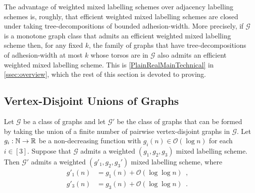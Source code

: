 \documentclass{patmorin}
\newcommand{\Oh}{\mathcal{O}}
\begin{document}
The advantage of weighted mixed labelling schemes over adjacency labelling schemes is, roughly, that efficient weighted mixed labelling schemes are closed under taking tree-decompositions of bounded adhesion-width. More precisely, if $\mathcal{G}$ is a monotone graph class that admits an efficient weighted mixed labelling scheme then, for any fixed $k$, the family of graphs that have tree-decompositions of adhesion-width at most $k$ whose torsos are in $\mathcal{G}$ also admits an efficient weighted mixed labelling scheme. This is \cref{PlainRealMainTechnical} in \cref{ssec:overview}, which the rest of this section is devoted to proving.

\subsection{Vertex-Disjoint Unions of Graphs}



\begin{lem}\label{disjoint_union_ii}
    Let $\mathcal{G}$ be a class of graphs and let $\mathcal{G}'$ be the class of graphs that can be formed by taking the union of a finite number of pairwise vertex-disjoint graphs in $\mathcal{G}$.
    Let $g_i:\mathbb{N}\to\mathbb{R}$ be a non-decreasing function  with $g_i(n)\in \Oh(\log n)$ for each $i\in[3]$.
    Suppose that $\mathcal{G}$ admits a weighted $(g_1,g_2,g_3)$ mixed labelling scheme.
    Then $\mathcal{G}'$ admits a weighted $(g'_1,g_2,g_3')$ mixed labelling scheme, where
    \begin{align*}
        g'_1(n) & = g_1(n)+\Oh(\log\log n)\enspace, \\
        g'_3(n) & = g_3(n)+\Oh(\log\log n) \enspace .
    \end{align*}
  \end{lem}
\end{document}
